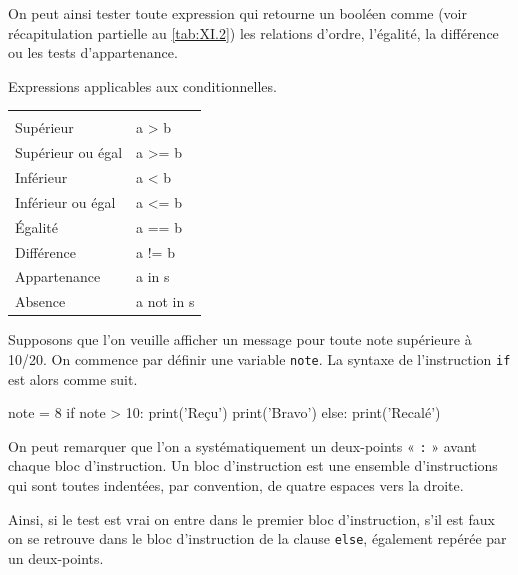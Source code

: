 On peut ainsi tester toute expression qui retourne un booléen com\-me (voir récapitulation partielle au \cref{tab:XI.2}) les relations d'ordre, l'égalité, la différence ou les tests d'appartenance.

\begin{margintable}
\caption{\label{tab:XI.2}Expressions applicables aux conditionnelles.}
\small
\renewcommand*{\arraystretch}{1.6}
\begin{tabularx}{\linewidth}{l>{\ttfamily}Y}
 &
 \\
Supérieur & a > b \\
Supérieur ou égal & a >= b \\
Inférieur & a < b \\
Inférieur ou égal & a <= b \\
Égalité & a == b \\
Différence & a != b \\
Appartenance & a in s\\
Absence & a not in s \\
\end{tabularx}%
\end{margintable}

Supposons que l'on veuille afficher un message pour toute note supérieure à 10/20. On commence par définir une variable \texttt{note}. La syntaxe de l'instruction \texttt{if} est alors comme suit.

\begin{idleconsole}
\begin{pyconsole}
note = 8
if note > 10:
    print('Reçu')
    print('Bravo')
else:
    print('Recalé')

\end{pyconsole}
\end{idleconsole}

On peut remarquer que l'on a systématiquement un deux-points « \texttt{:} » avant chaque bloc d'instruction. Un bloc d'instruction est une ensemble d'instructions qui sont toutes indentées, par convention, de quatre espaces vers la droite.

Ainsi, si le test est vrai on entre dans le premier bloc d'instruction, s'il est faux on se retrouve dans le bloc d'instruction de la clause \texttt{else}, également repérée par un deux-points.

